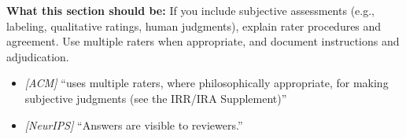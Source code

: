 \noindent\textbf{What this section should be:}
If you include subjective assessments (e.g., labeling, qualitative ratings, human judgments), explain rater procedures and agreement. Use multiple raters when appropriate, and document instructions and adjudication.
\begin{itemize}
  \item \textit{[ACM]} ``uses multiple raters, where philosophically appropriate, for making subjective judgments (see the IRR/IRA Supplement)''
  \item \textit{[NeurIPS]} ``Answers are visible to reviewers.''
\end{itemize}
